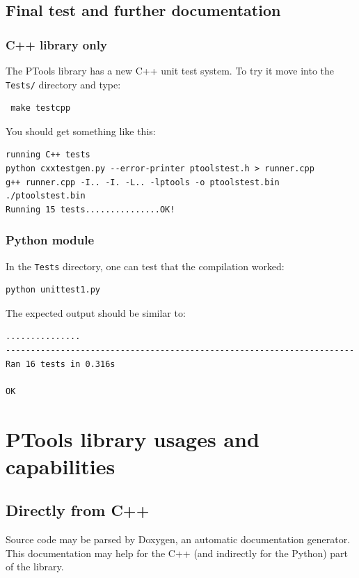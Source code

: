 \documentclass[12pt,a4paper]{article}
\begin{document}
\subsection{Final test and further documentation}

\subsubsection{C++ library only}

The PTools library has a new C++ unit test system. To try it move into the {\tt Tests/} directory and
type: 
\begin{verbatim}
 make testcpp
\end{verbatim}

You should get something like this:

\begin{verbatim}
running C++ tests
python cxxtestgen.py --error-printer ptoolstest.h > runner.cpp
g++ runner.cpp -I.. -I. -L.. -lptools -o ptoolstest.bin
./ptoolstest.bin
Running 15 tests...............OK!
\end{verbatim}


\subsubsection{Python module}
In the {\tt Tests} directory, one can test that the compilation worked:
\begin{verbatim}
python unittest1.py
\end{verbatim}

The expected output should be similar to:
\begin{verbatim}
...............
----------------------------------------------------------------------
Ran 16 tests in 0.316s

OK
\end{verbatim}


\section{PTools library usages and capabilities}

\subsection{Directly from C++}

Source code may be parsed by Doxygen, an automatic documentation generator.
This documentation may help for the C++ (and indirectly for the Python)
part of the library. 
\end{document}
